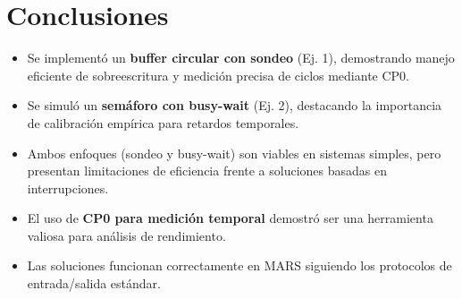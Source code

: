 \documentclass[12pt, a4paper]{article}
\begin{document}
\section{Conclusiones}
\begin{itemize}
    \item Se implementó un \textbf{buffer circular con sondeo} (Ej. 1), demostrando manejo eficiente de sobreescritura y medición precisa de ciclos mediante CP0.
    \item Se simuló un \textbf{semáforo con busy-wait} (Ej. 2), destacando la importancia de calibración empírica para retardos temporales.
    \item Ambos enfoques (sondeo y busy-wait) son viables en sistemas simples, pero presentan limitaciones de eficiencia frente a soluciones basadas en interrupciones.
    \item El uso de \textbf{CP0 para medición temporal} demostró ser una herramienta valiosa para análisis de rendimiento.
    \item Las soluciones funcionan correctamente en MARS siguiendo los protocolos de entrada/salida estándar.
\end{itemize}
\end{document}

